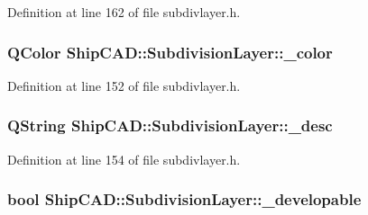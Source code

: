 Definition at line 162 of file subdivlayer.\-h.

\hypertarget{classShipCAD_1_1SubdivisionLayer_a6da22248952737662360fa3b2730a35f}{
\subsubsection[{\-\_\-color}]{\setlength{\rightskip}{0pt plus 5cm}Q\-Color Ship\-C\-A\-D\-::\-Subdivision\-Layer\-::\-\_\-color\hspace{0.3cm}{\ttfamily [protected]}}}\label{classShipCAD_1_1SubdivisionLayer_a6da22248952737662360fa3b2730a35f}


Definition at line 152 of file subdivlayer.\-h.

\hypertarget{classShipCAD_1_1SubdivisionLayer_a33bbfedf8f0d130d91c74a65a575eb2a}{
\subsubsection[{\-\_\-desc}]{\setlength{\rightskip}{0pt plus 5cm}Q\-String Ship\-C\-A\-D\-::\-Subdivision\-Layer\-::\-\_\-desc\hspace{0.3cm}{\ttfamily [protected]}}}\label{classShipCAD_1_1SubdivisionLayer_a33bbfedf8f0d130d91c74a65a575eb2a}


Definition at line 154 of file subdivlayer.\-h.

\hypertarget{classShipCAD_1_1SubdivisionLayer_a81dad738f58f9b4632c1575d0b59ddb0}{
\subsubsection[{\-\_\-developable}]{\setlength{\rightskip}{0pt plus 5cm}bool Ship\-C\-A\-D\-::\-Subdivision\-Layer\-::\-\_\-developable\hspace{0.3cm}{\ttfamily [protected]}}}\label{classShipCAD_1_1SubdivisionLayer_a81dad738f58f9b4632c1575d0b59ddb0}


